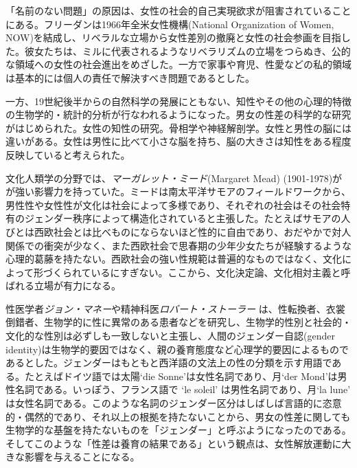 \documentclass[dvipdfmx,uplatex]{jsarticle}
\begin{document}
「名前のない問題」の原因は、女性の社会的自己実現欲求が阻害されていることにある。フリーダンは1966年全米女性機構(National Organization of Women, NOW)を結成し、リベラルな立場から女性差別の撤廃と女性の社会参画を目指した。彼女たちは、ミルに代表されるようなリベラリズムの立場をつらぬき、公的な領域への女性の社会進出をめざした。一方で家事や育児、性愛などの私的領域は基本的には個人の責任で解決すべき問題であるとした。

一方、19世紀後半からの自然科学の発展にともない、知性やその他の心理的特徴の生物学的・統計的分析が行なわれるようになった。男女の性差の科学的な研究がはじめられた。女性の知性の研究。骨相学や神経解剖学。女性と男性の脳には違いがある。女性は男性に比べて小さな脳を持ち、脳の大きさは知性をある程度反映していると考えられた。



文化人類学の分野では、\emph{マーガレット・ミード}(Margaret Mead) (1901-1978)がが強い影響力を持っていた。ミードは南太平洋サモアのフィールドワークから、男性性や女性性が文化は社会によって多様であり、それぞれの社会はその社会特有のジェンダー秩序によって構造化されていると主張した\citep{ミード61:男性と女性}。たとえばサモアの人びとは西欧社会とは比べものにならないほど性的に自由であり、おだやかで対人関係での衝突が少なく、また西欧社会で思春期の少年少女たちが経験するような心理的葛藤を持たない。西欧社会の強い性規範は普遍的なものではなく、文化によって形づくられているにすぎない。ここから、文化決定論、文化相対主義と呼ばれる立場が有力になる。


性医学者\emph{ジョン・マネー}や精神科医\emph{ロバート・ストーラー} \citep{ストーラー73:性と性別}は、性転換者、衣裳倒錯者、生物学的に性に異常のある患者などを研究し、生物学的性別と社会的・文化的な性別は必ずしも一致しないと主張し、人間のジェンダー自認(gender identity)は生物学的要因ではなく、親の養育態度など心理学的要因によるものであるとした。ジェンダーはもともと西洋語の文法上の性の分類を示す用語である。たとえばドイツ語では太陽`die Sonne'は女性名詞であり、月`der Mond'は男性名詞である。いっぽう、フランス語で `le soleil' は男性名詞であり、月`la lune' は女性名詞である。このような名詞のジェンダー区分はしばしば言語的に恣意的・偶然的であり、それ以上の根拠を持たないことから、男女の性差に関しても生物学的な基盤を持たないものを「ジェンダー」と呼ぶようになったのである。そしてこのような「性差は養育の結果である」という観点は、女性解放運動に大きな影響を与えることになる。
\end{document}
